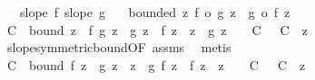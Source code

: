 \begin{isabellebody}
\ \ \ {\isachardoublequoteopen}slope\ f{\isachardoublequoteclose}\ {\isachardoublequoteopen}slope\ g{\isachardoublequoteclose}\isanewline
\ \ \ {\isachardoublequoteopen}bounded\ {\isacharparenleft}{\kern0pt}{\isasymlambda}z{\isachardot}{\kern0pt}\ {\isacharparenleft}{\kern0pt}f\ o\ g{\isacharparenright}{\kern0pt}\ z\ {\isacharminus}{\kern0pt}\ {\isacharparenleft}{\kern0pt}g\ o\ f{\isacharparenright}{\kern0pt}\ z{\isacharparenright}{\kern0pt}{\isachardoublequoteclose}\isanewline
%
\isadelimproof
%
\endisadelimproof
%
\isatagproof
{}\isamarkupfalse%
\ {\isacharminus}{\kern0pt}\isanewline
\ \ \isamarkupfalse%
\ C\ \ bound{\isacharcolon}{\kern0pt}\ {\isachardoublequoteopen}{\isasymbar}z\ {\isacharasterisk}{\kern0pt}\ f\ {\isacharparenleft}{\kern0pt}g\ z{\isacharparenright}{\kern0pt}\ {\isacharminus}{\kern0pt}\ {\isacharparenleft}{\kern0pt}g\ z{\isacharparenright}{\kern0pt}\ {\isacharasterisk}{\kern0pt}\ {\isacharparenleft}{\kern0pt}f\ z{\isacharparenright}{\kern0pt}{\isasymbar}\ {\isasymle}\ {\isacharparenleft}{\kern0pt}{\isasymbar}z{\isasymbar}\ {\isacharplus}{\kern0pt}\ {\isasymbar}g\ z{\isasymbar}\ {\isacharplus}{\kern0pt}\ {}{\isacharparenright}{\kern0pt}\ {\isacharasterisk}{\kern0pt}\ C{\isachardoublequoteclose}\ {\isachardoublequoteopen}{}\ {\isasymle}\ C{\isachardoublequoteclose}\ \ z\ \isamarkupfalse%
\ slope{\isacharunderscore}{\kern0pt}symmetric{\isacharunderscore}{\kern0pt}bound{\isacharbrackleft}{\kern0pt}OF\ assms{\isacharparenleft}{\kern0pt}{}{\isacharparenright}{\kern0pt}{\isacharbrackright}{\kern0pt}\ \isamarkupfalse%
\ metis\isanewline
\ \ \isamarkupfalse%
\ C{\isacharprime}{\kern0pt}\ \ bound{\isacharprime}{\kern0pt}{\isacharcolon}{\kern0pt}\ {\isachardoublequoteopen}{\isasymbar}{\isacharparenleft}{\kern0pt}f\ z{\isacharparenright}{\kern0pt}\ {\isacharasterisk}{\kern0pt}\ {\isacharparenleft}{\kern0pt}g\ z{\isacharparenright}{\kern0pt}\ {\isacharminus}{\kern0pt}\ z\ {\isacharasterisk}{\kern0pt}\ g\ {\isacharparenleft}{\kern0pt}f\ z{\isacharparenright}{\kern0pt}{\isasymbar}\ {\isasymle}\ {\isacharparenleft}{\kern0pt}{\isasymbar}f\ z{\isasymbar}\ {\isacharplus}{\kern0pt}\ {\isasymbar}z{\isasymbar}\ {\isacharplus}{\kern0pt}\ {}{\isacharparenright}{\kern0pt}\ {\isacharasterisk}{\kern0pt}\ C{\isacharprime}{\kern0pt}{\isachardoublequoteclose}\ {\isachardoublequoteopen}{}\ {\isasymle}\ C{\isacharprime}{\kern0pt}{\isachardoublequoteclose}\ \ z\ \isamarkupfalse%

\end{isabellebody}
